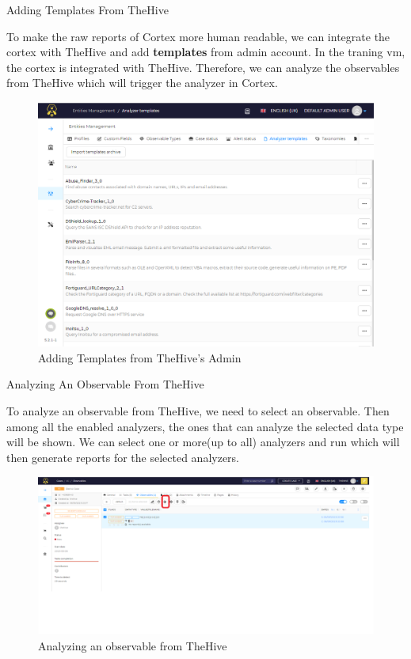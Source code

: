 \begin{frame}{Adding Templates From TheHive}
\begin{justify}
        To make the raw reports of Cortex more human readable, we can integrate the cortex with TheHive and add \textbf{templates} from admin account. In the traning vm, the cortex is integrated with TheHive. Therefore, we can analyze the observables from TheHive which will trigger the analyzer in Cortex.
\end{justify}

    \begin{figure}[htp]
    \centering
    \includegraphics[scale = 0.22]{adding-templates.png}
    \caption{Adding Templates from TheHive's Admin}
    \label{fig:adding-templates}
\end{figure}
\end{frame}

\begin{frame}{Analyzing An Observable From TheHive}
\begin{justify}
    To analyze an observable from TheHive, we need to select an observable. Then among all the enabled analyzers, the ones that can analyze the selected data type will be shown. We can select one or more(up to all) analyzers and run which will then generate reports for the selected analyzers.
\end{justify}

\begin{figure}[htp]
    \centering
    \includegraphics[scale = 0.37]{analyze-observables-1.png}
    \caption{Analyzing an observable from TheHive}
    \label{fig:analyzing-observable-1}
\end{figure}
    
\end{frame}

